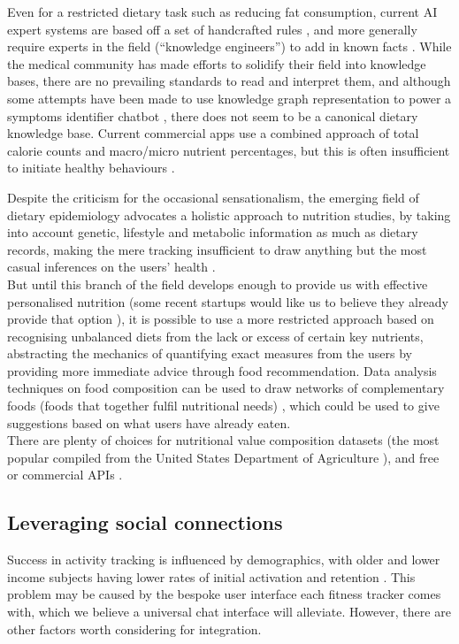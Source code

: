 Even for a restricted dietary task such as reducing fat consumption, current AI expert systems are based off a set of handcrafted rules \cite{Prochaska2005}, and more generally require experts in the field (``knowledge engineers'') to add in known facts \cite{Chen2012}. While the medical community has made efforts to solidify their field into knowledge bases, there are no prevailing standards to read and interpret them, and although some attempts have been made to use knowledge graph representation to power a symptoms identifier chatbot \cite{minutoloa2017conversational}, there does not seem to be a canonical dietary knowledge base. Current commercial apps use a combined approach of total calorie counts and macro/micro nutrient percentages, but this is often insufficient to initiate healthy behaviours \cite{Davis2016}.

Despite the criticism for the occasional sensationalism, the emerging field of dietary epidemiology advocates a holistic approach to nutrition studies, by taking into account genetic, lifestyle and metabolic information as much as dietary records, making the mere tracking insufficient to draw anything but the most casual inferences on the users' health \cite{byers2001food}. \\
But until this branch of the field develops enough to provide us with effective personalised nutrition (some recent startups would like us to believe they already provide that option \cite{habitwebsite}), it is possible to use a more restricted approach based on recognising unbalanced diets from the lack or excess of certain key nutrients, abstracting the mechanics of quantifying exact measures from the users by providing more immediate advice through food recommendation. Data analysis techniques on food composition can be used to draw networks of complementary foods (foods that together fulfil nutritional needs) \cite{Kim2015a}, which could be used to give suggestions based on what users have already eaten. \\
There are plenty of choices for nutritional value composition datasets (the most popular compiled from the United States Department of Agriculture \cite{usda}), and free or commercial APIs \cite{foodapis}.
\subsection{Leveraging social connections}
Success in activity tracking is influenced by demographics, with older and lower income subjects having lower rates of initial activation and retention \cite{Patel2017}. This problem may be caused by the bespoke user interface each fitness tracker comes with, which we believe a universal chat interface will alleviate. However, there are other factors worth considering for integration. 

